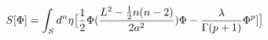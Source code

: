 \begin{equation}
S[\Phi] = \int_{S}d^n\eta\big{[}\frac{1}{2}\Phi(\frac{L^2-\frac{1}{2}n(n-2)}{2a^2})\Phi - 
\frac{\lambda}{\Gamma(p+1)}\Phi^p]\big{]}
\end{equation}

